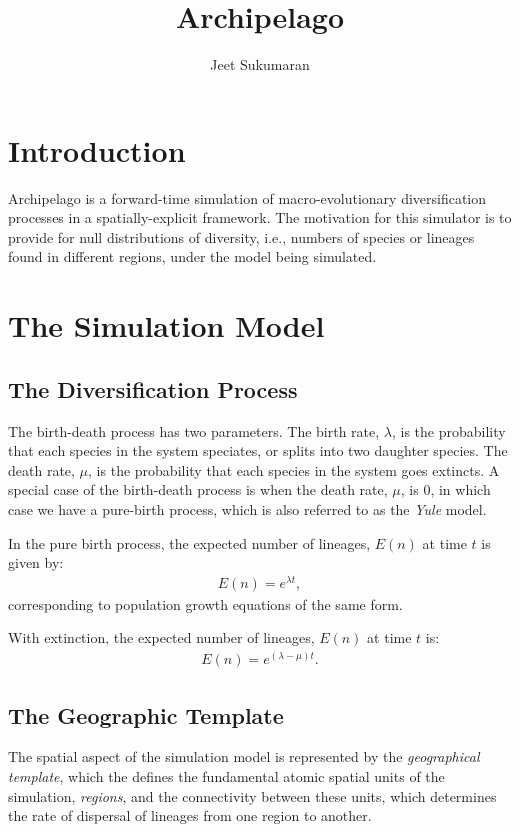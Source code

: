 \documentclass[11pt]{article}
\title{Archipelago}
\author{Jeet Sukumaran}
\begin{document}
\maketitle
\section*{Introduction}
Archipelago is a forward-time simulation of macro-evolutionary diversification processes in a spatially-explicit framework.
The motivation for this simulator is to provide for null distributions of diversity, i.e., numbers of species or lineages found in different regions, under the model being simulated.

\section*{The Simulation Model}

\subsection*{The Diversification Process}
The birth-death process has two parameters.
The birth rate, $\lambda$, is the probability that each species in the system speciates, or splits into two daughter species.
The death rate, $\mu$, is the probability that each species in the system goes extincts.
A special case of the birth-death process is when the death rate, $\mu$, is 0, in which case we have a pure-birth process, which is also referred to as the \textit{Yule} model.

In the pure birth process, the expected number of lineages, $E(n)$ at time $t$ is given by:
\begin{align*}
E(n) = e^{\lambda t},
\end{align*}
corresponding to population growth equations of the same form.

With extinction, the expected number of lineages, $E(n)$ at time $t$ is:
\begin{align*}
E(n) = e^{(\lambda-\mu) t}.
\end{align*}

\subsection*{The Geographic Template}

The spatial aspect of the simulation model is represented by the \textit{geographical template}, which the defines the fundamental atomic spatial units of the simulation, \textit{regions}, and the connectivity between these units, which determines the rate of dispersal of lineages from one region to another.
\end{document}
